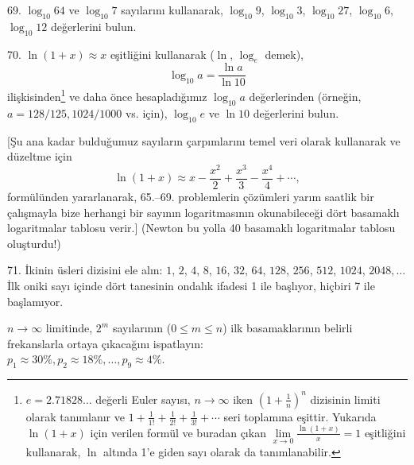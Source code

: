 \begin{problem}{69.}
	$\log_{10} 64$ ve $\log_{10} 7$ sayılarını kullanarak, $\log_{10} 9$, $\log_{10} 3$,
    $\log_{10} 27$, $\log_{10} 6$, $\log_{10} 12$ değerlerini bulun.
\end{problem}

\begin{problem}{70.}
	$\ln (1+x) \approx x$ eşitliğini kullanarak ($\ln$,  $\log_e$ demek),
\begin{equation*}
		\log_{10} a=\frac{\ln a}{\ln 10}
	\end{equation*}
ilişkisinden\footnote{$e = 2{.}71828\dots$ değerli Euler sayısı, $n\to \infty$ iken
	$\left(1+\frac{1}{n}\right)^n$  dizisinin limiti olarak tanımlanır ve
	$1+\frac{1}{1!} +\frac{1}{2!}+\frac{1}{3!}+\dotsb$ seri toplamına eşittir. Yukarıda 
	 $\ln (1+x)$ için verilen formül ve buradan çıkan $\lim\limits_{x\to 0}\frac{\ln(1+x)}{x} = 1$
eşitliğini kullanarak, $\ln$ altında 1'e giden sayı olarak da tanımlanabilir.}
 ve daha önce hesapladığımız $\log_{10} a$ değerlerinden (ör\-ne\-ğin, $a=128/125, 1024/1000$ vs. için), $\log_{10} e$ ve    $\ln 10$ değerlerini bulun.

	[Şu ana kadar  bulduğumuz sayıların çarpımlarını temel veri olarak kullanarak ve düzeltme için 
	\begin{equation*}
		\ln (1+x) \approx x-\frac{x^2}{2}+\frac{x^3}{3}-\frac{x^4}{4}+\dotsb,
	\end{equation*}
	formülünden yararlanarak, 65.--69. problemlerin çözümleri  yarım sa\-at\-lik bir çalışmayla bize herhangi bir sayının logaritmasının oku\-na\-bi\-le\-ce\-ği dört basamaklı logaritmalar tablosu verir.] (Newton bu yolla 40 basamaklı logaritmalar tablosu oluşturdu!)
\end{problem}

\begin{problem}{71.}
	İkinin üsleri dizisini ele alın: $1$, $2$, $4$, $8$, $16$, $32$, $64$,
	$128$, $256$, $512$, $1024$, $2048, \dotsc$ İlk oniki sayı içinde dört tanesinin ondalık ifadesi 1 ile başlıyor, hiçbiri 7 ile başlamıyor.

	$n \to \infty$ limitinde, $2^m$ sayılarının ($0\leqslant m \leqslant n$) ilk basamaklarının 
	belirli frekanslarla ortaya çıkacağını ispatlayın: \\
	$p_1 \approx 30\%, p_2 \approx 18\%, \dotsc, p_9 \approx 4\%$.
\end{problem}

